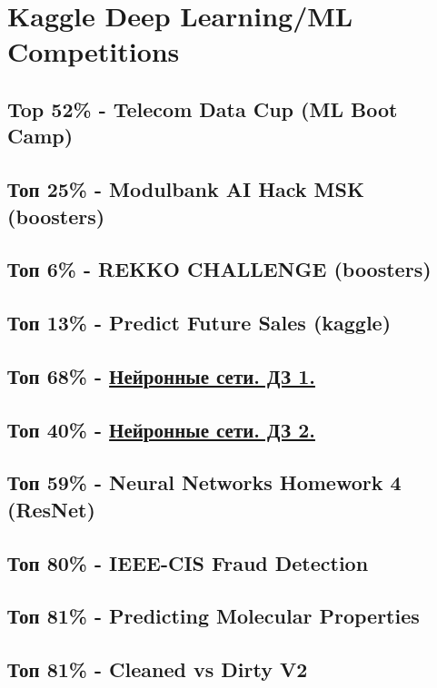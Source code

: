 \documentclass[11pt]{article}
\begin{document}
\section{Kaggle Deep Learning/ML Competitions}
\label{sec:orgb6d2ed6}
\subsection{Top 52\% - Telecom Data Cup (ML Boot Camp)}
\label{sec:orge16ef52}
\subsection{Топ 25\% - Modulbank AI Hack MSK (boosters)}
\label{sec:orgfa92ce3}
\subsection{Топ 6\% - REKKO CHALLENGE (boosters)}
\label{sec:orgf6e8e85}
\subsection{Топ 13\% - Predict Future Sales (kaggle)}
\label{sec:orgb7834f8}
\subsection{Топ 68\% - \href{https://www.kaggle.com/c/2019s-neuralnet-track}{Нейронные сети. ДЗ 1.}}
\label{sec:orgecf42b6}
\subsection{Топ 40\% - \href{https://www.kaggle.com/c/nn-track-2019-spring-hw2}{Нейронные сети. ДЗ 2.}}
\label{sec:orgb1d4973}
\subsection{Топ 59\% - Neural Networks Homework 4 (ResNet)}
\label{sec:orgf5e2903}
\subsection{Топ 80\% - IEEE-CIS Fraud Detection}
\label{sec:orgc51b9ec}
\subsection{Топ 81\% - Predicting Molecular Properties}
\label{sec:org2b07bb0}
\subsection{Топ 81\% - Cleaned vs Dirty V2}
\label{sec:orgec2ae0f}
\end{document}
